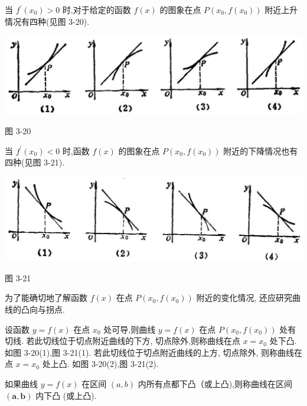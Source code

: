 \documentclass[lang=cn,newtx,10pt,scheme=chinese]{elegantbook}
\begin{document}
当 \({f}^{\prime }\left( {x}_{0}\right) > 0\) 时,对于给定的函数 \(f\left( x\right)\) 的图象在点 \(P\left( {{x}_{0},f\left( {x}_{0}\right) }\right)\) 附近上升情况有四种(见图 3-20).

\begin{center}
\includegraphics[max width=1.0\textwidth]{images/01912c18-5c3f-733d-b775-749ba9897a9d_165_181993.jpg}
\end{center}

图 3-20

当 \({f}^{\prime }\left( {x}_{0}\right) < 0\) 时,函数 \(f\left( x\right)\) 的图象在点 \(P\left( {{x}_{0},f\left( {x}_{0}\right) }\right)\) 附近的下降情况也有四种(见图 3-21).

\begin{center}
\includegraphics[max width=1.0\textwidth]{images/01912c18-5c3f-733d-b775-749ba9897a9d_165_929562.jpg}
\end{center}

图 3-21

为了能确切地了解函数 \(f\left( x\right)\) 在点 \(P\left( {{x}_{0},f\left( {x}_{0}\right) }\right)\) 附近的变化情况, 还应研究曲线的凸向与拐点.

设函数 \(y = f\left( x\right)\) 在点 \({x}_{0}\) 处可导,则曲线 \(y = f\left( x\right)\) 在点 \(P\left( {{x}_{0},f\left( {x}_{0}\right) }\right)\) 处有切线. 若此切线位于切点附近曲线的下方, 切点除外,则称曲线在点 \(x = {x}_{0}\) 处下凸. 如图 3-20(1),图 3-21(1). 若此切线位于切点附近曲线的上方, 切点除外, 则称曲线在点 \(x = {x}_{0}\) 处上凸. 如图 3-20(2),图 3-21(2).

如果曲线 \(y = f\left( x\right)\) 在区间 \(\left( {a,b}\right)\) 内所有点都下凸（或上凸),则称曲线在区间 \(\left( {\mathbf{a},\mathbf{b}}\right)\) 内下凸 (或上凸).
\end{document}
